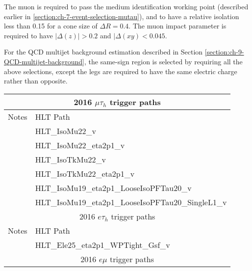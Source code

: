The muon is required to pass the medium identification working point (described earlier in \ref{section:ch-7-event-selection-mutau}), and to have a relative isolation less than 0.15 for a cone size of $\Delta R = 0.4$. The muon impact parameter is required to have $|\Delta(z)| > 0.2$ and $|\Delta(xy) < 0.045$. 

For the QCD multijet background estimation described in Section \ref{section:ch-9-QCD-multijet-background}, the same-sign region is selected by requiring all the above selections, except the legs are required to have the same electric charge rather than opposite.


\begin{table}[]
    \centering
    \begin{tabular}{ll}
    \hline
    \multicolumn{2}{|c|}{\footnotesize{2016 $\mu\tau_{h}$ trigger paths}}                                     \\ \hline
    \footnotesize{Notes}          & \footnotesize{HLT Path}                                           \\ \hline
                                  & \footnotesize{HLT\_IsoMu22\_v}                                    \\
                                  & \footnotesize{HLT\_IsoMu22\_eta2p1\_v}                            \\
                                  & \footnotesize{HLT\_IsoTkMu22\_v}                                  \\
                                  & \footnotesize{HLT\_IsoTkMu22\_eta2p1\_v}                          \\
                                  & \footnotesize{HLT\_IsoMu19\_eta2p1\_LooseIsoPFTau20\_v}           \\
                                  & \footnotesize{HLT\_IsoMu19\_eta2p1\_LooseIsoPFTau20\_SingleL1\_v} \\ \hline
    \multicolumn{2}{|c|}{\footnotesize{2016  $e\tau_{h}$ trigger paths}}                                         \\ \hline
    \footnotesize{Notes}          & \footnotesize{HLT Path}                                           \\ \hline
                                  & \footnotesize{HLT\_Ele25\_eta2p1\_WPTight\_Gsf\_v}                \\ \hline
    \multicolumn{2}{|c|}{\footnotesize{2016 $e\mu$ trigger paths}}                                            \\ \hline

\end{tabular}
\end{table}
